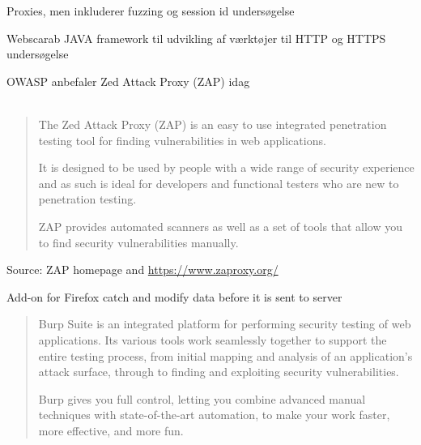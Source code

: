 \documentclass[Screen16to9,17pt]{foils}
\begin{document}
\begin{list1}
\item Proxies, men inkluderer fuzzing og session id undersøgelse
\item Webscarab JAVA framework til udvikling af værktøjer til HTTP og HTTPS undersøgelse\\

\item OWASP anbefaler Zed Attack Proxy (ZAP) idag\\
\\
\end{list1}




\begin{quote}
The Zed Attack Proxy (ZAP) is an easy to use integrated penetration testing tool for finding vulnerabilities in web applications.

It is designed to be used by people with a wide range of security experience and as such is ideal for developers and functional testers who are new to penetration testing.

ZAP provides automated scanners as well as a set of tools that allow you to find security vulnerabilities manually.
\end{quote}

Source: ZAP homepage  and
\url{https://www.zaproxy.org/}



Add-on for Firefox catch and modify data before it is sent to server\\





\begin{quote}
Burp Suite is an integrated platform for performing security testing of web applications. Its various tools work seamlessly together to support the entire testing process, from initial mapping and analysis of an application's attack surface, through to finding and exploiting security vulnerabilities.

Burp gives you full control, letting you combine advanced manual techniques with state-of-the-art automation, to make your work faster, more effective, and more fun.
\end{quote}
\end{document}

